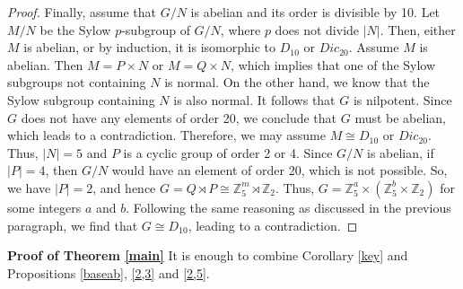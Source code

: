 \documentclass{amsart}
\def \geq {\geqslant}
\begin{document}
\begin{proof}
Finally, assume that \( G/N \) is abelian and its order is divisible by 10. Let \( M/N \) be the Sylow \( p \)-subgroup of \( G/N \), where \( p \) does not divide \( |N| \). Then, either \( M \) is abelian, or by induction, it is isomorphic to \( D_{10} \) or \( Dic_{20} \). Assume \( M \) is abelian. Then \( M = P \times N \) or \( M = Q \times N \), which implies that one of the Sylow subgroups not containing \( N \) is normal. On the other hand, we know that the Sylow subgroup containing \( N \) is also normal. It follows that \( G \) is nilpotent. Since \( G \) does not have any elements of order 20, we conclude that \( G \) must be abelian, which leads to a contradiction. Therefore, we may assume \( M \cong D_{10} \) or \( Dic_{20} \). Thus, \( |N| = 5 \) and \( P \) is a cyclic group of order 2 or 4. Since \( G/N \) is abelian, if \( |P| = 4 \), then \( G/N \) would have an element of order 20, which is not possible. So, we have \( |P| = 2 \), and hence \( G = Q \rtimes P \cong \mathbb{Z}_5^m \rtimes \mathbb{Z}_2 \). Thus, \( G = \mathbb{Z}_5^a \times (\mathbb{Z}_5^b \times \mathbb{Z}_2) \) for some integers \( a \) and \( b \). Following the same reasoning as discussed in the previous paragraph, we find that \( G \cong D_{10} \), leading to a contradiction.
    \end{proof}

\textbf{Proof of Theorem \ref{main}} It is enough to combine Corollary \ref{key} and Propositions \ref{baseab}, \ref{2,3} and \ref{2,5}.


\end{document}
